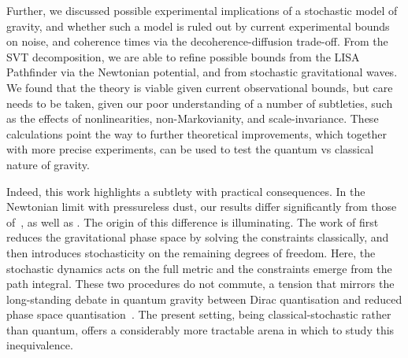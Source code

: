 \documentclass[aps,preprintnumbers,superscriptaddress,longbibliography]{revtex4-1}
\newcommand{\MS}[1]{{\color{blue}#1}}
\begin{document}
Further, we discussed possible experimental implications of a stochastic model of gravity, and whether such a model is ruled out by current experimental bounds on noise, and coherence times via the decoherence-diffusion trade-off. From the SVT decomposition, we are able to refine possible bounds from the LISA Pathfinder via the Newtonian potential, and from stochastic gravitational waves. We found that the theory is viable given current observational bounds, but care needs to be taken, given our poor understanding of a number of subtleties, such as the effects of nonlinearities, non-Markovianity, and scale-invariance. These calculations point the way to further theoretical improvements, which together with more precise experiments, can be used to test the quantum vs classical nature of gravity.

Indeed, this work highlights a subtlety with practical consequences. In the Newtonian limit with pressureless dust\cite{oppenheim2026non}, our results differ significantly from those of~\cite{layton2023weak}, as well as \cite{tilloy2016sourcing}. The origin of this difference is illuminating. The work of \cite{layton2023weak} first reduces the gravitational phase space by solving the constraints classically, and then introduces stochasticity on the remaining degrees of freedom. Here, the stochastic dynamics acts on the full metric and the constraints emerge from the path integral. These two procedures do not commute, a tension that mirrors the long-standing debate in quantum gravity between Dirac quantisation and reduced phase space quantisation~\cite{isham1992canonical,kuchar1992time}. The present setting, being classical-stochastic rather than quantum, offers a considerably more tractable arena in which to study this inequivalence.


\end{document}
